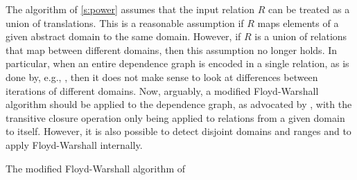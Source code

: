 The algorithm of \autoref{s:power} assumes that the input relation $R$
can be treated as a union of translations.
This is a reasonable assumption if $R$ maps elements of a given
abstract domain to the same domain.
However, if $R$ is a union of relations that map between different
domains, then this assumption no longer holds.
In particular, when an entire dependence graph is encoded
in a single relation, as is done by, e.g.,
, then it does not make
sense to look at differences between iterations of different domains.
Now, arguably, a modified Floyd-Warshall algorithm should
be applied to the dependence graph, as advocated by
, with the transitive closure operation
only being applied to relations from a given domain to itself.
However, it is also possible to detect disjoint domains and ranges
and to apply Floyd-Warshall internally.

\linesnumbered
\begin{algorithm}
\caption{The modified Floyd-Warshall algorithm of
\protect{}}
\label{a:Floyd}
%
\BlankLine
\SetVline
\dontprintsemicolon
%
\end{algorithm}

